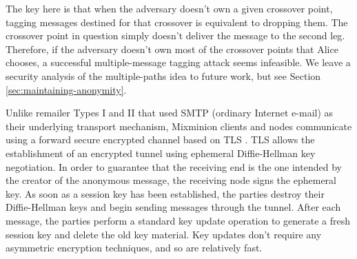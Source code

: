 \documentclass[times,10pt,twocolumn]{article}
\begin{document}

The key here is that when the adversary doesn't own a given crossover
point, tagging messages destined for that crossover is equivalent to
dropping them.  The crossover point in question simply doesn't deliver
the message to the second leg. Therefore, if the adversary doesn't own
most of the crossover points that Alice chooses, a successful
multiple-message tagging attack seems infeasible.  We leave a security
analysis of the multiple-paths idea to future work, but see
Section \ref{sec:maintaining-anonymity}.



\label{subsec:link-encrypt}

Unlike remailer Types I and II that used SMTP \cite{SMTP} (ordinary
Internet e-mail) as their underlying transport mechanism, Mixminion
clients and nodes communicate using a forward secure encrypted channel
based on TLS \cite{TLS}.  
TLS allows the establishment of an encrypted tunnel using ephemeral
Diffie-Hellman key negotiation. In order to guarantee that the receiving end is
the one intended by the creator of the anonymous message, the
receiving node signs the ephemeral key. As soon as a session key
has been established, the parties destroy their Diffie-Hellman keys
and begin sending messages through the tunnel. After each message, the
parties perform a standard key update operation to generate a fresh
session key and delete the old key material.  Key updates don't require any
asymmetric encryption techniques, and so are relatively fast.

%
\end{document}
